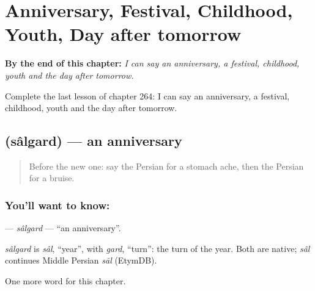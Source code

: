 
\chapter{Anniversary, Festival, Childhood, Youth, Day after tomorrow}
\label{ch:fa-anniversary-festival-childhood-youth-day-after-tomorrow}

\begin{chapteropening}
\textbf{By the end of this chapter:} \emph{I can say an anniversary, a festival, childhood, youth and the day after tomorrow.}

Complete the last lesson of chapter 264: I can say an anniversary, a festival, childhood, youth and the day after tomorrow.
\end{chapteropening}

\section[\texorpdfstring{\fa{سالگرد} (sâlgard)}{سالگرد (sâlgard)}]{ (sâlgard) — an anniversary}

\label{lesson:FA-C264-salgard}



\begin{quote}
Before the new one: say the Persian for a stomach ache, then the Persian for a bruise.
\end{quote}

\subsection*{You'll want to know: }
\textbf{} — \emph{sâlgard} — \textquotedblleft{}an anniversary\textquotedblright{}.

\begin{cousinweb}
\emph{sâlgard} is \emph{sâl}, \textquotedblleft{}year\textquotedblright{}, with \emph{gard}, \textquotedblleft{}turn\textquotedblright{}: the turn of the year. Both are native; \emph{sâl} continues Middle Persian \emph{sāl} (EtymDB).
\end{cousinweb}

\begin{grammarlens}[title={What you've built}]
One more word for this chapter.
\end{grammarlens}

